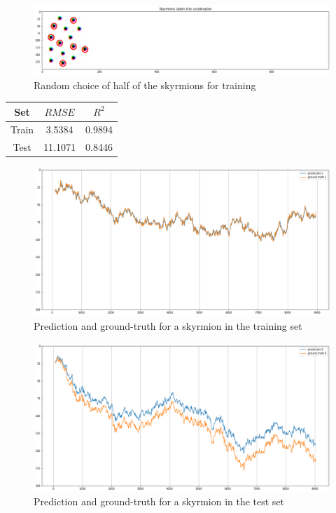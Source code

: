 \documentclass[a4paper]{article}
\begin{document}
  \begin{figure}
    \centering
    \includegraphics[width=\textwidth]{regression4_random_half}
    \caption{Random choice of half of the skyrmions for training}
    \label{fig:regression4_random_half}
  \end{figure}

  \begin{table}[h!]
    \centering
    \begin{tabular}{|c | c c|} 
     \hline
     Set & $RMSE$ & $R^2$ \\ [0.5ex] 
     \hline\hline
     Train & 3.5384 & 0.9894 \\ 
     Test & 11.1071 & 0.8446 \\
     \hline
    \end{tabular}
  \end{table}

  \begin{figure}
    \centering
    \includegraphics[width=\textwidth]{regression4_random_half_train_plot}
    \caption{Prediction and ground-truth for a skyrmion in the training set}
    \label{fig:regression4_random_half_train_plot}
  \end{figure}

  \begin{figure}
    \centering
    \includegraphics[width=\textwidth]{regression4_random_half_test_plot}
    \caption{Prediction and ground-truth for a skyrmion in the test set}
    \label{fig:regression4_random_half_test_plot}
  \end{figure}
\end{document}
